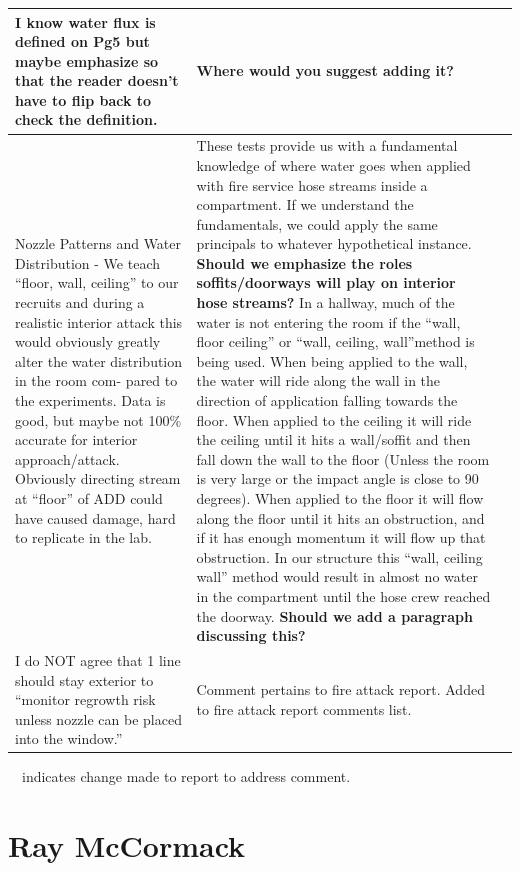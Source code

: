 \documentclass[12pt,oneside]{book}
\begin{document}
\begin{landscape}
\begin{longtable}{|L{4in}|L{3.75in}|c|}
 		\hline
 		I know water flux is defined on Pg5 but maybe emphasize so that the reader doesn't have to flip back to check the definition. &
 		\textbf{Where would you suggest adding it?} & \\

 		\hline
 		Nozzle Patterns and Water Distribution - We teach ``floor, wall, ceiling'' to our recruits and during a realistic interior attack this would obviously greatly alter the water distribution in the room com- pared to the experiments. Data is good, but maybe not 100\% accurate for interior approach/attack. Obviously directing stream at ``floor'' of ADD could have caused damage, hard to replicate in the lab. & 
 		These tests provide us with a fundamental knowledge of where water goes when applied with fire service hose streams inside a compartment. If we understand the fundamentals, we could apply the same principals to whatever hypothetical instance. \textbf{Should we emphasize the roles soffits/doorways will play on interior hose streams?} In a hallway, much of the water is not entering the room if the ``wall, floor ceiling'' or ``wall, ceiling, wall''method is being used. When being applied to the wall, the water will ride along the wall in the direction of application falling towards the floor. When applied to the ceiling it will ride the ceiling until it hits a wall/soffit and then fall down the wall to the floor (Unless the room is very large or the impact angle is close to 90 degrees). When applied to the floor it will flow along the floor until it hits an obstruction, and if it has enough momentum it will flow up that obstruction. In our structure this ``wall, ceiling wall'' method would result in almost no water in the compartment until the hose crew reached the doorway.  \textbf{Should we add a paragraph discussing this?} & \\

 		\hline
 		I do NOT agree that 1 line should stay exterior to ``monitor regrowth risk unless nozzle can be placed into the window.'' &
 		Comment pertains to fire attack report. Added to fire attack report comments list. & \\

 		\hline
\end{longtable}
\checkmark~~indicates change made to report to address comment.

\section{Ray McCormack}
\begin{longtable}{|L{4in}|L{3.75in}|c|}


\end{longtable}
\end{landscape}
\end{document}
